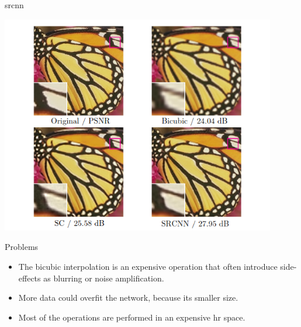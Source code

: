 \documentclass[hyperref={unicode}, xcolor=dvipsnames, t]{beamer}
\begin{document}
\begin{frame}{\texorpdfstring{\gls{srcnn}}{Lg}}
\begin{center}
{            \includegraphics[height=0.9\textheight,width=0.9\textwidth,keepaspectratio]{figures/example.png}
        }
    \end{center}
\end{frame}

\begin{frame}{Problems}
    \begin{itemize}
        \item The \alert{bicubic interpolation} is an expensive operation that often introduce side-effects as blurring or noise amplification.
        \item More data could \alert{overfit} the network, because its smaller size.
        \item Most of the operations are performed in an expensive \alert{\gls{hr}} space.
    \end{itemize}
\end{frame}
\end{document}
